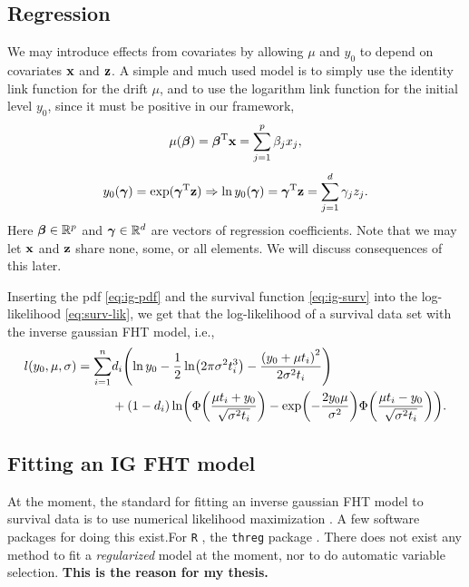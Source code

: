 \subsection{Regression}
We may introduce effects from covariates by allowing $\mu$ and $y_0$ to depend on covariates $\mathbf{x}$ and $\mathbf{z}$. A simple and much used model
\citep{leewhitmore2006, caroni2017}
is to simply use the identity link function for the drift $\mu$, and to use the logarithm link function for the initial level $y_0$, since it must be positive in our framework,
\begin{equation}\label{eq:y0}
    \mu(\boldsymbol{\beta})=\boldsymbol{\beta}^{\text{T}}\mathbf{x}=\sum_{j=1}^p \beta_jx_j,
\end{equation}
\begin{equation}\label{eq:mu}
    y_0(\boldsymbol{\gamma})=\exp(\boldsymbol{\gamma}^{\text{T}}\mathbf{z})\Rightarrow\ln y_0(\boldsymbol{\gamma})=\boldsymbol{\gamma}^{\text{T}}\mathbf{z}=\sum_{j=1}^d \gamma_jz_j.
\end{equation}
Here $\boldsymbol{\beta}\in\mathbb{R}^p$ and $\boldsymbol{\gamma}\in\mathbb{R}^d$ are vectors of regression coefficients. Note that we may let $\mathbf{x}$ and $\mathbf{z}$ share none, some, or all elements. We will discuss consequences of this later.

Inserting the pdf \eqref{eq:ig-pdf} and the survival function \eqref{eq:ig-surv} into the log-likelihood \eqref{eq:surv-lik}, we get that the log-likelihood of a survival data set with the inverse gaussian FHT model, i.e.,
\begin{align}\label{eq:loglik}
\begin{split}
    l(y_0,\mu,\sigma)=\sum_{i=1}^n&d_i\p*{\ln y_0-\frac{1}{2}\ln\p*{2\pi\sigma^2\ti^3}-\frac{\p*{y_0+\mu\ti}^2}{2\sigma^2\ti}} \\
    &+
    (1-d_i)\ln\p*{\Phi\p*{\frac{\mu\ti+y_0}{\sqrt{\sigma^2\ti}}}-\exp\p*{-\frac{2y_0\mu}{\sigma^2}}\Phi\p*{\frac{\mu\ti-y_0}{\sqrt{\sigma^2\ti}}}}.
\end{split}
\end{align}

\subsection{Fitting an IG FHT model}
At the moment, the standard for fitting an inverse gaussian FHT model to survival data is to use numerical likelihood maximization \citep{caroni2017}. A few software packages for doing this exist.For \verb|R| \citep{Rlang}, the \verb|threg| package \citep{threg}. There does not exist any method to fit a \textit{regularized} model at the moment, nor to do automatic variable selection. \textbf{This is the reason for my thesis.}




